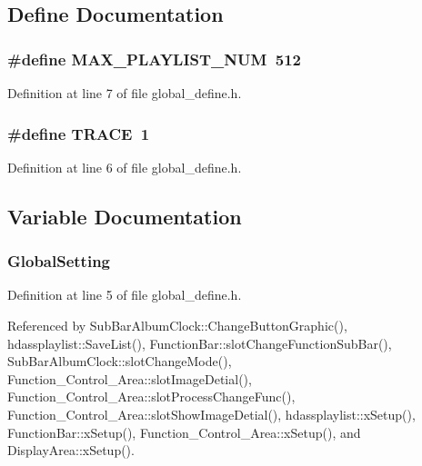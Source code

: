 \subsection{Define Documentation}
\subsubsection{\setlength{\rightskip}{0pt plus 5cm}\#define MAX\_\-PLAYLIST\_\-NUM\ 512}\label{global__define_8h_a1}




Definition at line 7 of file global\_\-define.h.
\subsubsection{\setlength{\rightskip}{0pt plus 5cm}\#define TRACE\ 1}\label{global__define_8h_a0}




Definition at line 6 of file global\_\-define.h.

\subsection{Variable Documentation}
\subsubsection{ {\bf Global\-Setting}}\label{global__define_8h_a2}




Definition at line 5 of file global\_\-define.h.

Referenced by Sub\-Bar\-Album\-Clock::Change\-Button\-Graphic(), hdassplaylist::Save\-List(), Function\-Bar::slot\-Change\-Function\-Sub\-Bar(), Sub\-Bar\-Album\-Clock::slot\-Change\-Mode(), Function\_\-Control\_\-Area::slot\-Image\-Detial(), Function\_\-Control\_\-Area::slot\-Process\-Change\-Func(), Function\_\-Control\_\-Area::slot\-Show\-Image\-Detial(), hdassplaylist::x\-Setup(), Function\-Bar::x\-Setup(), Function\_\-Control\_\-Area::x\-Setup(), and Display\-Area::x\-Setup().